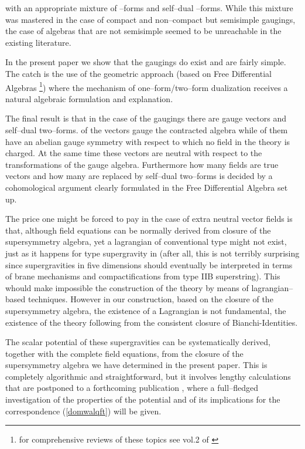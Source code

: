 \documentclass[a4paper,12pt]{article}
\begin{document}
with an appropriate mixture of \coordHE{}--forms and self--dual
\coordHE{}--forms. While this mixture was mastered in the case of compact
and non--compact but semisimple gaugings, the case of
\coordHE{} algebras that are not semisimple seemed to
be unreachable in the existing literature.
\par
In the present paper we show that the \coordHE{} gaugings do exist and
are fairly simple. The catch is the use of the geometric approach (based on Free
Differential Algebras \footnote{for  comprehensive
reviews of these topics see vol.2 of
\cite{castdauriafre}}) where the mechanism of one--form/two--form dualization
receives a natural algebraic formulation and explanation.
\par
The final result is that in the case of the \coordHE{} gaugings there
are \coordHE{} gauge vectors and \coordHE{} self--dual two--forms. \coordHE{} of the
vectors gauge the contracted algebra while \coordHE{} of them have an abelian gauge symmetry with
respect to which no field in the theory is charged. At the same time these vectors are
neutral with respect to the transformations of the gauge algebra. Furthermore
how many fields are true vectors and how many are replaced by self--dual
two--forms is decided by a
cohomological argument clearly formulated in the Free Differential Algebra set up.
\par
The price one might be forced to pay in the case of \coordHE{} extra
neutral vector fields is that, although field equations can be
normally derived from closure of the supersymmetry algebra, yet a
lagrangian of conventional type might not exist, just as it
happens for type \coordHE{} supergravity in \coordHE{} (after all, this is
not terribly surprising since \coordHE{} supergravities in five
dimensions should eventually be interpreted in terms of brane
mechanisms and compactifications from type IIB superstring).
This whould make impossible the construction of the theory
by means of lagrangian--based techniques.
However in our construction, based on the closure of the
supersymmetry algebra, the existence of a Lagrangian is not
fundamental, the existence of the theory following from the
consistent closure of Bianchi-Identities.

The scalar potential of these supergravities can be systematically
derived, together with the complete field equations, from the closure of the
supersymmetry algebra we have determined in the present paper.
This is completely algorithmic and straightforward, but it involves lengthy
calculations
that are postponed to a forthcoming publication \cite{next},
where a full--fledged investigation of the properties of the potential and of its
implications for the correspondence (\ref{domwalqft}) will be given.
\end{document}
